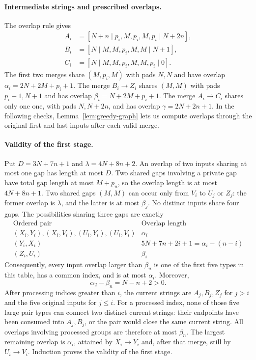 \documentclass[11pt,a4paper]{article}   %
\theoremstyle{compact}
\theoremstyle{compactdef}
\begin{document}
\paragraph{Intermediate strings and prescribed overlaps.}
The overlap rule gives
\[
\begin{aligned}
 A_i&=[N+n\mid p_i,M,p_i,M,p_i\mid N+2n],\\
 B_i&=[N\mid M,M,p_i,M,M\mid N+1],\\
 C_i&=[N\mid M,M,p_i,M,M,p_i\mid0].
\end{aligned}
\]
The first two merges share $(M,p_i,M)$ with pads $N,N$ and have overlap
$\alpha_i=2N+2M+p_i+1$. The merge $B_i\to Z_i$ shares $(M,M)$ with
pads $p_i-1,N+1$ and has overlap
$\beta_i=N+2M+p_i+1$. The merge $A_i\to C_i$ shares only one one,
with pads $N,N+2n$, and has overlap $\gamma=2N+2n+1$.
In the following checks, Lemma~\ref{lem:greedy-graph} lets us compute
overlaps through the original first and last inputs after each valid
merge.

\paragraph{Validity of the first stage.}
Put $D=3N+7n+1$ and $\lambda=4N+8n+2$.
An overlap of two inputs sharing at most one gap has length at most $D$.
Two shared gaps involving a private gap have total gap length at most
$M+p_n$, so the overlap length is at most $4N+8n+1$.
Two shared gaps $(M,M)$ can occur only from $V_i$ to $U_j$ or $Z_j$:
the former overlap is $\lambda$, and the latter is at most $\beta_j$.
No distinct inputs share four gaps. The possibilities sharing three
gaps are exactly
\[
\begin{array}{c|c}
 \text{Ordered pair}&\text{Overlap length}\\ \hline
 (X_i,Y_i),(X_i,V_i),(U_i,Y_i),(U_i,V_i)&\alpha_i\\
 (Y_i,X_i)&5N+7n+2i+1=\alpha_i-(n-i)\\
 (Z_i,U_i)&\beta_i
\end{array}
\]
Consequently, every input overlap larger than $\beta_n$ is one of the
first five types in this table, has a common index, and is at most
$\alpha_i$. Moreover,
\[
 \alpha_2-\beta_n=N-n+2>0.
\]
After processing indices greater than $i$, the current strings are
$A_j,B_j,Z_j$ for $j>i$ and the five original inputs for $j\le i$.
For a processed index, none of those five large pair types can connect
two distinct current strings: their endpoints have been consumed into
$A_j,B_j$, or the pair would close the same current string. All overlaps
involving processed groups are therefore at most $\beta_n$.
The largest remaining overlap is $\alpha_i$, attained by $X_i\to Y_i$
and, after that merge, still by $U_i\to V_i$. Induction proves the
validity of the first stage.
\end{document}
